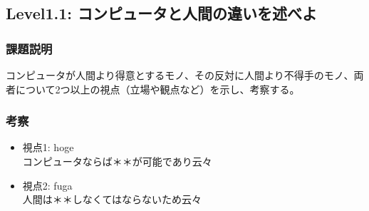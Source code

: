 \subsection{Level1.1: コンピュータと人間の違いを述べよ}
\subsubsection{課題説明}
コンピュータが人間より得意とするモノ、その反対に人間より不得手のモノ、両者について2つ以上の視点（立場や観点など）を示し、考察する。

\subsubsection{考察}
\begin{itemize}
 \item 視点1: hoge\\
コンピュータならば＊＊が可能であり云々
 \item 視点2: fuga\\
人間は＊＊しなくてはならないため云々
\end{itemize}
